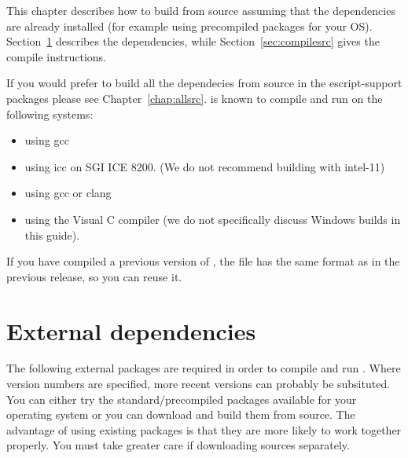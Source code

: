 %
%
%



This chapter describes how to build \esfinley from source assuming that the dependencies are already installed (for example using precompiled packages for your OS).
Section~\ref{sec:deps} describes the dependencies, while Section~\ref{sec:compilesrc} gives the compile instructions.

If you would prefer to build all the dependecies from source in the escript-support packages please see Chapter~\ref{chap:allsrc}.
\esfinley is known to compile and run on the following systems:
\begin{itemize}
 \item \linux using gcc
\item \linux using icc on SGI ICE 8200. (We do not recommend building with intel-11)
\item \macosx using gcc or clang
\item \winxp using the Visual C compiler (we do not specifically discuss Windows builds in this guide).
\end{itemize}

If you have compiled a previous version of \esfinley, the  file has the same format
as in the previous release, so you can reuse it.


\section{External dependencies}
\label{sec:deps}
The following external packages are required in order to compile and run \esfinley.
Where version numbers are specified, more recent versions can probably be subsituted.
You can either try the standard/precompiled packages available for your operating system or you can download and build them from source.
The advantage of using existing packages is that they are more likely to work together properly.
You must take greater care if downloading sources separately.

